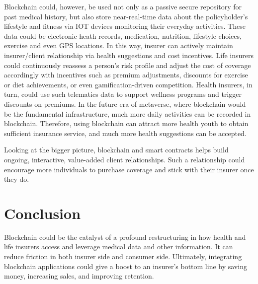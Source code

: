 Blockchain could, however, be used not only as a passive secure repository for past medical history,
but also store near-real-time data about the policyholder’s lifestyle and fitness via
IOT devices monitoring their everyday activities. These data could be electronic heath records,
medication, nutrition, lifestyle choices, exercise and even GPS locations.
In this way, insurer can actively maintain insurer/client relationship via health suggestions and cost incentives.
Life insurers could continuously reassess a person’s risk profile and
adjust the cost of coverage accordingly with incentives such as premium adjustments,
discounts for exercise or diet achievements, or even gamification-driven competition.
Health insurers, in turn, could use such telematics data to support wellness programs and
trigger discounts on premiums. In the future era of metaverse, where blockchain would be
the fundamental infrastructure, much more daily activities can be recorded in blockchain.
Therefore, using blockchain can attract more health youth to obtain sufficient insurance service,
and much more health suggestions can be accepted.

Looking at the bigger picture, blockchain and smart contracts
helps build ongoing, interactive, value-added client relationships.
Such a relationship could encourage more individuals to purchase coverage and
stick with their insurer once they do.

\section{Conclusion}

Blockchain could be the catalyst of a profound restructuring in how health and life insurers
access and leverage medical data and other information. It can reduce friction in both insurer side and consumer side.
Ultimately, integrating blockchain applications could give a boost to an insurer’s bottom line by saving money, increasing sales,
and improving retention.
